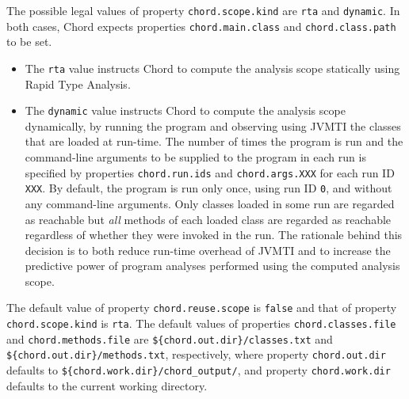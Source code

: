 \begin{itemize}
The possible legal values of property \verb+chord.scope.kind+ are \verb+rta+ and \verb+dynamic+.
In both cases, Chord expects properties \verb+chord.main.class+ and \verb+chord.class.path+
to be set.
\begin{itemize}
\item
The \verb+rta+ value instructs Chord to compute the analysis scope statically using Rapid Type Analysis.
\item
The \verb+dynamic+ value instructs Chord to compute the analysis scope dynamically, by running the program
and observing using JVMTI the classes that are loaded at run-time.
The number of times the program is run and the command-line arguments to be supplied to
the program in each run is specified by properties \verb+chord.run.ids+ and
\verb+chord.args.XXX+ for each run ID \verb+XXX+.  By default, the program is run only once, using run ID \verb+0+,
and without any command-line arguments.
Only classes loaded in some run are regarded as reachable but {\it all} methods of each loaded class are regarded
as reachable regardless of whether they were invoked in the run.
The rationale behind this decision is to both reduce run-time overhead of JVMTI and to increase the
predictive power of program analyses performed using the computed analysis scope.
\end{itemize}
\end{itemize}

The default value of property \verb+chord.reuse.scope+ is \verb+false+ and that of
property \verb+chord.scope.kind+ is \verb+rta+.
The default values of properties \verb+chord.classes.file+ and \verb+chord.methods.file+ are
\verb+${chord.out.dir}/classes.txt+ and \verb+${chord.out.dir}/methods.txt+, respectively,
where property \verb+chord.out.dir+ defaults to \verb+${chord.work.dir}/chord_output/+,
and property \verb+chord.work.dir+ defaults to the current working directory.

